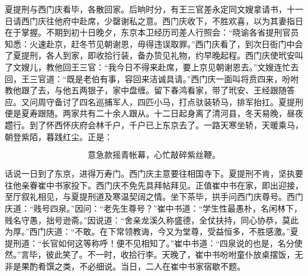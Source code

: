 夏提刑与西门庆看毕，各散回家。后晌时分，有王三官差永定同文嫂拿请书，十一日请西门庆往他府中赴席，少罄谢私之意。西门庆收下，不胜欢喜，以为其妻指日在于掌握。不期到初十日晚夕，东京本卫经历司差人行照会：“晓谕各省提刑官员知悉：火速赴京，赶冬节见朝谢恩，毋得违误取罪。”西门庆看了，到次日衙门中会了夏提刑，各人到家，即收拾行装，备办贽见礼物，约早晚起程。西门庆使玳安叫了文嫂儿，教他回王三官：“我今日不得来赴席，要上京见朝谢恩去。”文嫂连忙去回，王三官道：“既是老伯有事，容回来洁诚具请。”西门庆一面叫将贲四来，吩咐教他跟了去，与他五两银子，家中盘缠。留下春鸿看家，带了玳安、王经跟随答应。又问周守备讨了四名巡捕军人，四匹小马，打点驮装轿马，排军抬扛。夏提刑便是夏寿跟随。两家共有二十余人跟从。十二日起身离了清河县，冬天易晚，昼夜趱行。到了怀西怀庆府会林千户，千户已上东京去了。一路天寒坐轿，天暖乘马，朝登紫陌，暮践红尘。正是：

\[
意急款摇青帐幕，心忙敲碎紫丝鞭。
\]

话说一日到了东京，进得万寿门。西门庆主意要往相国寺下。夏提刑不肯，坚执要往他亲眷崔中书家投下。西门庆不免先具拜帖拜见。正值崔中书在家，即出迎接，至厅叙礼相见，与夏提刑道及寒温契阔之情。坐下茶毕，拱手问西门庆尊号。西门庆道：“贱号四泉。”因问：“老先生尊号？”崔中书道：“学生性最愚朴，名闲林下，贱名守愚，拙号逊斋。”因说道：“舍亲龙溪久称盛德，全仗扶持，同心协恭，莫此为厚。”西门庆道：“不敢。在下常领教诲，今又为堂尊，受益恒多，不胜感激。”夏提刑道：“长官如何这等称呼！便不见相知了。”崔中书道：“四泉说的也是，名分使然。”言毕，彼此笑了。不一时，收拾行李。天晚了，崔中书吩咐童仆放桌摆饭，无非是果酌肴馔之类，不必细说。当日，二人在崔中书家宿歇不题。

